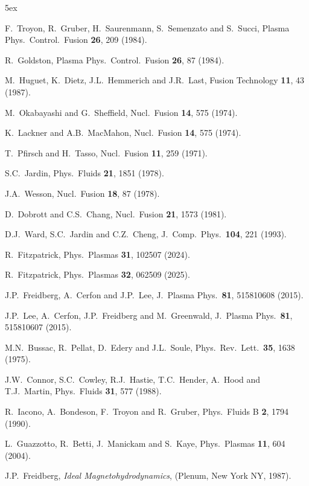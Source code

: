 \documentclass[12pt,prb,aps]{revtex4-1}
\begin{document}
\begin{thebibliography}{99}\baselineskip 5ex

   F.~Troyon, R.~Gruber, H.~Saurenmann, S.~Semenzato and S.~Succi, Plasma Phys.\ Control.\ Fusion {\bf 26}, 209 (1984). 

 R.~Goldston, Plasma Phys.\ Control.\ Fusion {\bf 26}, 87 (1984).

 M.~Huguet, K.~Dietz,  J.L.~Hemmerich and J.R.~Last, Fusion Technology  {\bf 11}, 43 (1987).

 M.~Okabayashi and G.~Sheffield, Nucl.\ Fusion {\bf 14}, 575 (1974). 

 K.~Lackner and A.B.~MacMahon, Nucl.\ Fusion {\bf 14}, 575 (1974). 

 T.~Pfirsch and H.~Tasso, Nucl.\ Fusion {\bf 11}, 259 (1971).

 S.C.~Jardin, Phys.\ Fluids {\bf 21}, 1851 (1978). 

 J.A.~Wesson, Nucl.\ Fusion {\bf 18}, 87 (1978).

 D.~Dobrott and C.S.~Chang, Nucl.\ Fusion {\bf 21}, 1573 (1981).

 D.J.~Ward, S.C.~Jardin and C.Z.~Cheng, J.\ Comp.\ Phys.\ {\bf 104}, 221 (1993).

 R.~Fitzpatrick, Phys.\ Plasmas {\bf 31}, 102507 (2024).

 R.~Fitzpatrick, Phys.\ Plasmas {\bf 32}, 062509 (2025).

 J.P.~Freidberg, A.~Cerfon and J.P.~Lee, J.\ Plasma Phys.\ {\bf 81}, 515810608 (2015).

 J.P.~Lee, A.~Cerfon, J.P.~Freidberg and M.~Greenwald, J.\ Plasma Phys.\ {\bf 81}, 515810607 (2015).

 M.N.~Bussac, R.~Pellat, D.~Edery and J.L.~Soule, Phys.\ Rev.\ Lett.\ {\bf 35}, 1638 (1975).

 J.W.~Connor,  S.C.~Cowley, R.J.~Hastie,  T.C.~Hender,  A.~Hood  and T.J.~Martin,  Phys.\ Fluids {\bf 31}, 577 (1988).

 R.~Iacono, A.~Bondeson, F.~Troyon and R.~Gruber, Phys.\ Fluids B {\bf 2}, 1794 (1990).

 L.~Guazzotto,  R.~Betti, J.~Manickam and  S.~Kaye, Phys.\ Plasmas {\bf 11}, 604 (2004).

 J.P.~Freidberg, {\em Ideal Magnetohydrodynamics}, (Plenum, New York NY, 1987).


\end{thebibliography}
\end{document}
